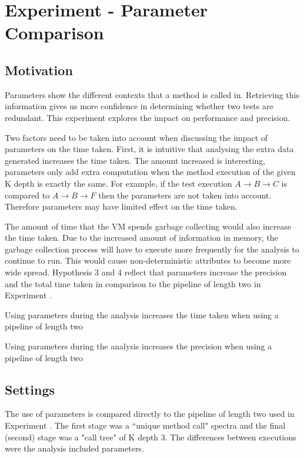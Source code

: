 \section{Experiment  - Parameter Comparison}
\label{sec:param}

\subsection{Motivation}
Parameters show the different contexts that a method is called in. Retrieving this information gives us more confidence in determining whether two tests are redundant. This experiment explores the impact on performance and precision.

Two factors need to be taken into account when discussing the impact of parameters on the time taken. First, it is intuitive that analysing the extra data generated increases the time taken. The amount increased is interesting, parameters only add extra computation when the method execution of the given K depth is exactly the same. For example, if the test execution $A \rightarrow  B \rightarrow  C$ is compared to $A \rightarrow  B \rightarrow  F$ then the parameters are not taken into account. Therefore parameters may have limited effect on the time taken. 

The amount of time that the VM spends garbage collecting would also increase the time taken. Due to the increased amount of information in memory, the garbage collection process will have to execute more frequently for the analysis to continue to run. This would cause non-deterministic attributes to become more wide spread. Hypothesis 3 and 4 reflect that parameters increase the precision and the total time taken in comparison to the pipeline of length two in Experiment .

\begin{hyp}
Using parameters during the analysis increases the time taken when using a pipeline of length two
\end{hyp}

\begin{hyp}
Using parameters during the analysis increases the precision when using a pipeline of length two
\end{hyp}

\subsection{Settings}
The use of parameters is compared directly to the pipeline of length two used in Experiment . The first stage was a ``unique method call" spectra and the final (second) stage was a "call tree" of K depth 3. The differences between executions were the analysis included parameters.

